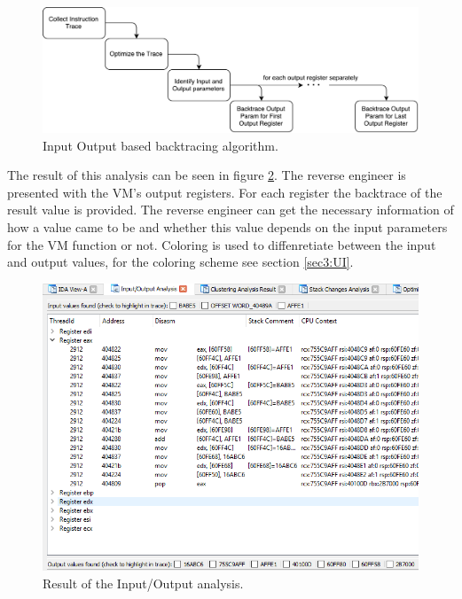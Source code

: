 \documentclass[10pt,twoside,a4paper,bibliography=totoc]{scrbook}
\begin{document}
\begin{figure}[htb]
\centering
\includegraphics[scale=0.60]{images/ch3/InputOutput_algo.pdf}
\caption{Input Output based backtracing algorithm.}
\label{io_algo}
\end{figure}

The result of this analysis can be seen in figure \ref{io_result}. The reverse engineer is presented with the VM's output registers. 
For each register the backtrace of the result value is provided. The reverse engineer can get the necessary information of how a value came to be and whether this value depends on the input parameters for the VM function or not.
Coloring is used to diffenretiate between the input and output values, for the coloring scheme see section \ref{sec3:UI}. 

\begin{figure}[H]
\centering
\includegraphics[scale=0.62]{images/ch3/InputOutput1.png}
\caption{Result of the Input/Output analysis.}
\label{io_result}
\end{figure}
\end{document}
